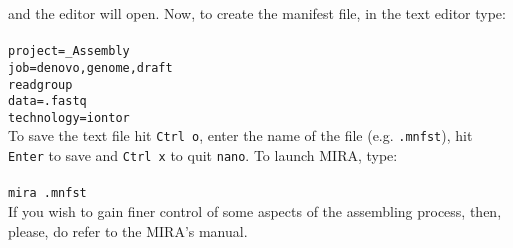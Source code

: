 and the editor will open. Now, to create the manifest file, in the text editor type:\\~\\
\texttt{project=\denovoReads\_Assembly\\
job=denovo,genome,draft\\
readgroup\\
data=\denovoReads.fastq\\
technology=iontor} \\

To save the text file hit \texttt{Ctrl o}, enter the name of the file (e.g. \texttt{\denovoReads.mnfst}),
hit \texttt{Enter} to save and \texttt{Ctrl x} to quit \texttt{nano}. To launch MIRA, type:\\~\\
\texttt{mira \denovoReads.mnfst}\\

If you wish to gain finer control of some aspects of the assembling process,
then, please, do refer to the MIRA's manual.
